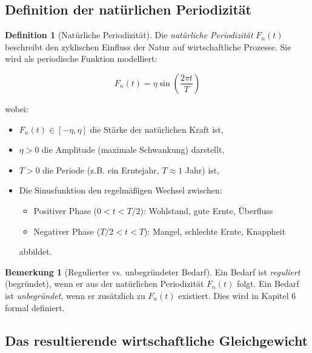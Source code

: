 \documentclass[a4paper, 12pt, twoside, openright]{report}
\theoremstyle{definition}
\newtheorem{definition}[theorem]{Definition}
\theoremstyle{definition}
\newtheorem{bemerkung}{Bemerkung}[chapter]
\begin{document}
\subsection{Definition der natürlichen Periodizität}

\begin{definition}[Natürliche Periodizität]\label{def:periodizitaet}
    Die \emph{natürliche Periodizität} $F_n(t)$ beschreibt den zyklischen Einfluss der Natur auf wirtschaftliche Prozesse. Sie wird als periodische Funktion modelliert:
    
    \begin{equation}
        \boxed{F_n(t) = \eta \sin\left(\frac{2\pi t}{T}\right)}
        \label{eq:periodizitaet}
    \end{equation}
    
    wobei:
    \begin{itemize}
        \item $F_n(t) \in [-\eta, \eta]$ die Stärke der natürlichen Kraft ist,
        \item $\eta > 0$ die Amplitude (maximale Schwankung) darstellt,
        \item $T > 0$ die Periode (z.B. ein Erntejahr, $T \approx 1$ Jahr) ist,
        \item Die Sinusfunktion den regelmäßigen Wechsel zwischen:
        \begin{itemize}
            \item Positiver Phase ($0 < t < T/2$): Wohlstand, gute Ernte, Überfluss
            \item Negativer Phase ($T/2 < t < T$): Mangel, schlechte Ernte, Knappheit
        \end{itemize}
        abbildet.
    \end{itemize}
\end{definition}

\begin{bemerkung}[Regulierter vs. unbegründeter Bedarf]
    
    Ein Bedarf ist \emph{reguliert} (begründet), wenn er aus der natürlichen Periodizität $F_n(t)$ folgt. Ein Bedarf ist \emph{unbegründet}, wenn er zusätzlich zu $F_n(t)$ existiert. Dies wird in Kapitel 6 formal definiert.
\end{bemerkung}

\subsection{Das resultierende wirtschaftliche Gleichgewicht}
\end{document}
